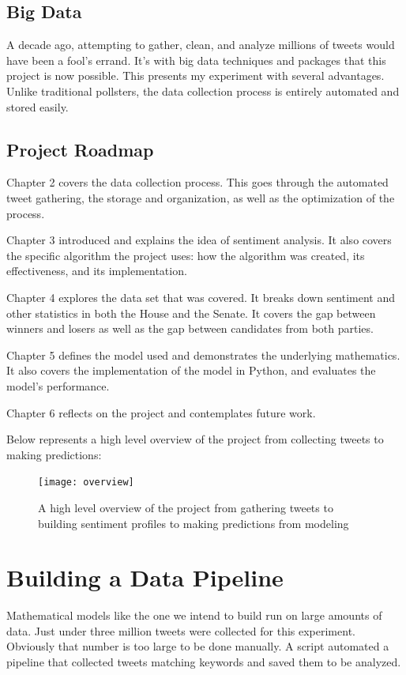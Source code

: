 \documentclass[11pt, twoside, reqno]{book}
\begin{document}
\section{Big Data}
\hspace{0.2in}A decade ago, attempting to gather, clean, and analyze millions of tweets would have been a fool's errand. It's with big data techniques and packages that this project is now possible. This presents my experiment with several advantages. Unlike traditional pollsters, the data collection process is entirely automated and stored easily.  

\section{Project Roadmap}
\hspace{0.2in}Chapter 2 covers the data collection process. This goes through the automated tweet gathering, the storage and organization, as well as the optimization of the process. 

Chapter 3 introduced and explains the idea of sentiment analysis. It also covers the specific algorithm the project uses: how the algorithm was created, its effectiveness, and its implementation.

Chapter 4 explores the data set that was covered. It breaks down sentiment and other statistics in both the House and the Senate. It covers the gap between winners and losers as well as the gap between candidates from both parties. 

Chapter 5 defines the model used and demonstrates the underlying mathematics. It also covers the implementation of the model in Python, and evaluates the model's performance. 

Chapter 6 reflects on the project and contemplates future work. 

Below represents a high level overview of the project from collecting tweets to making predictions:
\begin{figure}[H]
\centering
	\texttt{[image: overview]}
	\caption{A high level overview of the project from gathering tweets to building sentiment profiles to making predictions from modeling}
	\label{fig:overview}
\end{figure}




\chapter{Building a Data Pipeline}
\label{Ch:2}
\hspace{0.2in} Mathematical models like the one we intend to build run on large amounts of data. Just under three million tweets were collected for this experiment. Obviously that number is too large to be done manually. A script automated a pipeline that collected tweets matching keywords and saved them to be analyzed. 
\end{document}
